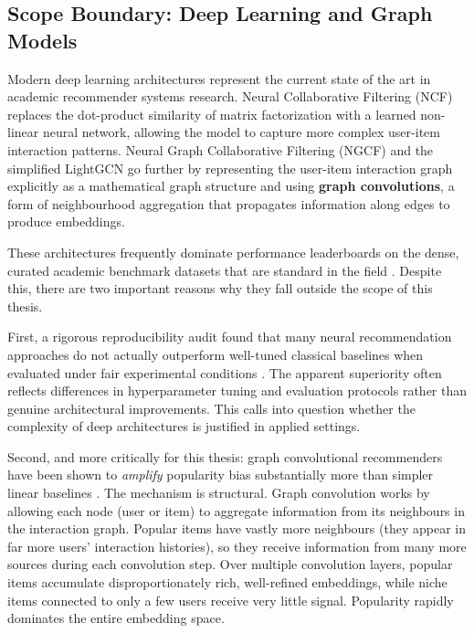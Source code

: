 \documentclass[11pt,a4paper]{report}
\begin{document}
\subsection{Scope Boundary: Deep Learning and Graph Models}

Modern deep learning architectures represent the current state of the art in academic recommender systems research. Neural Collaborative Filtering (NCF) \citep{he2017ncf} replaces the dot-product similarity of matrix factorization with a learned non-linear neural network, allowing the model to capture more complex user-item interaction patterns. Neural Graph Collaborative Filtering (NGCF) \citep{wang2019ngcf} and the simplified LightGCN \citep{he2020lightgcn} go further by representing the user-item interaction graph explicitly as a mathematical graph structure and using \textbf{graph convolutions}, a form of neighbourhood aggregation that propagates information along edges to produce embeddings.

These architectures frequently dominate performance leaderboards on the dense, curated academic benchmark datasets that are standard in the field \citep{he2017ncf, wang2019ngcf, he2020lightgcn}. Despite this, there are two important reasons why they fall outside the scope of this thesis.

First, a rigorous reproducibility audit found that many neural recommendation approaches do not actually outperform well-tuned classical baselines when evaluated under fair experimental conditions \citep{ferrari2019progress}. The apparent superiority often reflects differences in hyperparameter tuning and evaluation protocols rather than genuine architectural improvements. This calls into question whether the complexity of deep architectures is justified in applied settings.

Second, and more critically for this thesis: graph convolutional recommenders have been shown to \emph{amplify} popularity bias substantially more than simpler linear baselines \citep{chen2024gcnamplifypopularity}. The mechanism is structural. Graph convolution works by allowing each node (user or item) to aggregate information from its neighbours in the interaction graph. Popular items have vastly more neighbours (they appear in far more users' interaction histories), so they receive information from many more sources during each convolution step. Over multiple convolution layers, popular items accumulate disproportionately rich, well-refined embeddings, while niche items connected to only a few users receive very little signal. Popularity rapidly dominates the entire embedding space.
\end{document}
